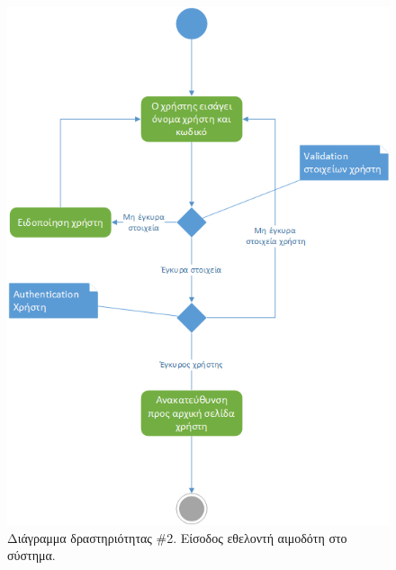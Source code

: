 		
		\begin{figure}[H]
		    \centering
		    \includegraphics[width=1\textwidth]{Login.png}
		    \caption{Διάγραμμα δραστηριότητας \#2. Είσοδος εθελοντή αιμοδότη στο σύστημα.}
		    \label{fig:login}
		\end{figure}
		
